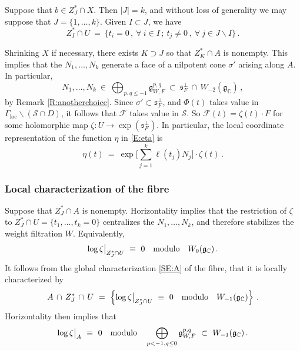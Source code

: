 \documentclass[12pt]{amsart}
\numberwithin{equation}{section}
\numberwithin{table}{section}
\def\z{\zeta}
\def\s{\sigma}
\def\bC{\mathbb{C}}
\def\sF{\mathscr{F}}
\def\fg{\mathfrak{g}}
\def\sS{\mathscr{S}}
\def\bs{\backslash}
\theoremstyle{definition}
\theoremstyle{definition}
\theoremstyle{remark}
\def\bs{\backslash}
\def\fs{\mathfrak{s}}
\begin{document}
Suppose that $b \in Z_J^* \cap X$.  Then $|J|=k$, and without loss of generality we may suppose that $J = \{1,\ldots,k\}$.  Given $I \subset  J$, we have
\[
  Z^*_I \cap U \ = \ 
  \{ t_i=0 \,, \ \forall \ i \in I \,;\ 
  	t_j \not=0 \,,\ \forall \ j \in J \bs I \} \,.
\]

Shrinking $X$ if necessary, there exists $K \supset  J$ so that $Z_K^* \cap A$ is nonempty.  This implies that the $N_1,\ldots,N_k$ generate a face of a nilpotent cone $\s'$ arising along $A$.  In particular, 
\begin{equation}\label{E:N}
  N_1,\ldots,N_k \ \in \ \bigoplus_{p,q\le-1}\fg^{p,q}_{W,F} 
  \ \subset \ \fs_F^\perp\,\cap\,W_{-2}(\fg_\bC) \,,
\end{equation}
by Remark \ref{R:anotherchoice}.  Since $\s' \subset \fs_F^\perp$, and $\Phi(t)$ takes value in $\Gamma_\mathrm{loc}\bs(\sS \cap D)$,  it follows that $\sF$ takes value in $\sS$.  So $\sF(t) = \zeta(t) \cdot F$ for  some holomorphic map $\zeta : U \to \exp(\fs_F^\perp)$.  In particular, the local coordinate representation of the function $\eta$ in \eqref{E:eta} is 
\begin{equation}\label{E:eta-loc0}
  \eta(t) \ = \ 
  \exp \Big[ \sum_{j=1}^k \ell(t_j) N_j \Big] \cdot \zeta(t) \,.
\end{equation}

\subsubsection{Local characterization of the fibre}\label{S:Aloc}

Suppose that $Z_J^* \cap A$ is nonempty.  Horizontality implies that the restriction of $\z$ to $Z_J^* \cap U = \{ t_1,\ldots,t_k=0 \}$ centralizes the $N_1,\ldots,N_k$, and therefore stabilizes the weight filtration $W$.  Equivalently, 
\begin{equation}\label{E:locW}
  \log \z \big|_{Z_J^* \cap U} \ \equiv \ 0
  \quad\hbox{modulo}\quad W_0(\fg_\bC) \,.
\end{equation}
It follows from the global characterization \eqref{SE:A} of the  fibre, that it is locally characterized by
\begin{equation}\label{E:locA}
  A \,\cap\, Z_J^* \,\cap\, U \ = \ 
  \left\{
  \log \z \big|_{Z_J^* \cap U} \ \equiv \ 0
  \quad\hbox{modulo}\quad W_{-1}(\fg_\bC) \right\} \,.
\end{equation}
Horizontality then implies that 
\begin{equation} \nonumber
  \log \z \big|_A \ \equiv \ 0
  \quad\hbox{modulo}\quad 
  \bigoplus_{p<-1,q \le 0}\fg^{p,q}_{W,F}
  \ \subset \ W_{-1}(\fg_\bC) \,.
\end{equation}
\end{document}
